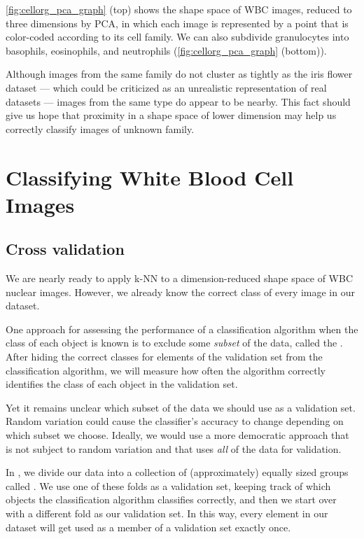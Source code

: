 \autoref{fig:cellorg_pca_graph} (top) shows the shape space of WBC images, reduced to three dimensions by PCA, in which each image is represented by a point that is color-coded according to its cell family. We can also subdivide granulocytes into basophils, eosinophils, and neutrophils (\autoref{fig:cellorg_pca_graph} (bottom)).

Although images from the same family do not cluster as tightly as the iris flower dataset --- which could be criticized as an unrealistic representation of real datasets --- images from the same type do appear to be nearby. This fact should give us hope that proximity in a shape space of lower dimension may help us correctly classify images of unknown family.\\

\FloatBarrier
{}

\section{Classifying White Blood Cell Images}
\label{sec:training}

\subsection{Cross validation}

We are nearly ready to apply k-NN to a dimension-reduced shape space of WBC nuclear images. However, we already know the correct class of every image in our dataset.

One approach for assessing the performance of a classification algorithm when the class of each object is known is to exclude some \textit{subset} of the data, called the . After hiding the correct classes for elements of the validation set from the classification algorithm, we will measure how often the algorithm correctly identifies the class of each object in the validation set.

Yet it remains unclear which subset of the data we should use as a validation set. Random variation could cause the classifier's accuracy to change depending on which subset we choose. Ideally, we would use a more democratic approach that is not subject to random variation and that uses \textit{all} of the data for validation.

In , we divide our data into a collection of  (approximately) equally sized groups called . We use one of these folds as a validation set, keeping track of which objects the classification algorithm classifies correctly, and then we start over with a different fold as our validation set. In this way, every element in our dataset will get used as a member of a validation set exactly once.

